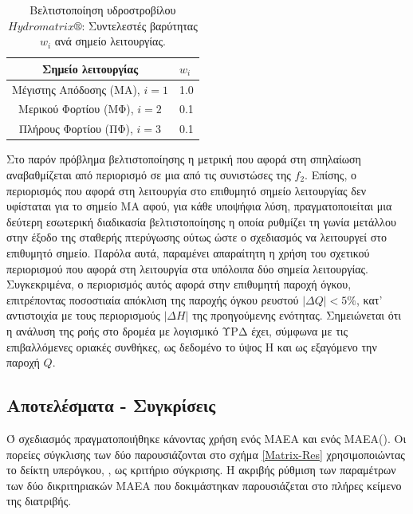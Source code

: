\begin{table}[h!]
\begin{center}
\begin{tabular}{ |c|l| }
\hline
Σημείο λειτουργίας & $w_i$\\
\hline
Μέγιστης Απόδοσης (ΜΑ), $i\!=\!1$  & 1.0\\
\hline
Μερικού Φορτίου  (ΜΦ), $i\!=\!2$ & 0.1\\
\hline
Πλήρους Φορτίου (ΠΦ), $i\!=\!3$  & 0.1\\
\hline
\end{tabular}
\caption{Βελτιστοποίηση υδροστροβίλου $Hydromatrix\circledR$: Συντελεστές βαρύτητας $w_i$ ανά σημείο λειτουργίας.}
\label{op-weights-M2}
\end{center}
\end{table}

Στο παρόν πρόβλημα βελτιστοποίησης η μετρική που αφορά στη σπηλαίωση αναβαθμίζεται από περιορισμό σε μια από τις συνιστώσες της $f_2$. Επίσης, ο περιορισμός που αφορά στη λειτουργία στο επιθυμητό σημείο λειτουργίας δεν υφίσταται για το σημείο ΜΑ αφού, για κάθε υποψήφια λύση, πραγματοποιείται μια δεύτερη εσωτερική διαδικασία βελτιστοποίησης η οποία ρυθμίζει τη γωνία μετάλλου στην έξοδο της σταθερής πτερύγωσης ούτως ώστε ο σχεδιασμός να λειτουργεί στο επιθυμητό σημείο. Παρόλα αυτά, παραμένει απαραίτητη η χρήση του σχετικού περιορισμού που αφορά στη λειτουργία στα υπόλοιπα δύο σημεία λειτουργίας. Συγκεκριμένα, ο περιορισμός αυτός αφορά στην επιθυμητή παροχή όγκου, επιτρέποντας ποσοστιαία απόκλιση  της παροχής όγκου ρευστού $|\Delta Q| < 5\%$, κατ' αντιστοιχία με τους περιορισμούς $|\Delta Η|$ της προηγούμενης ενότητας.  Σημειώνεται ότι η ανάλυση της ροής στο δρομέα με λογισμικό ΥΡΔ έχει, σύμφωνα με τις επιβαλλόμενες οριακές συνθήκες, ως δεδομένο το ύψος Η και ως εξαγόμενο την παροχή $Q$.
              

\subsection{Αποτελέσματα - Συγκρίσεις}
Ό σχεδιασμός πραγματοποιήθηκε κάνοντας χρήση ενός MAΕΑ και ενός ΜΑΕΑ(). Οι πορείες σύγκλισης των δύο παρουσιάζονται στο σχήμα \ref{Matrix-Res} χρησιμοποιώντας το δείκτη υπερόγκου, \cite{Zitz2007}, ως κριτήριο σύγκρισης.  Η ακριβής ρύθμιση των παραμέτρων των δύο δικριτηριακών MAΕΑ που δοκιμάστηκαν παρουσιάζεται στο πλήρες κείμενο της διατριβής. 

